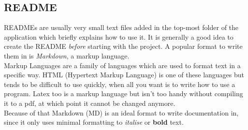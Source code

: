 \documentclass{article}
\begin{document}
	\subsection{README}
	READMEs are usually very small text files added in the top-most folder of the application which briefly explains how to use it. It is generally a good idea to create the README \textit{before} starting with the project. A popular format to write them in is \textit{Markdown}, a markup language. \\
	Markup Languages are a family of languages which are used to format text in a specific way. HTML (Hypertext Markup Language) is one of these languages but tends to be difficult to use quickly, when all you want is to write how to use a program. Latex too is a markup language but isn't too handy without compiling it to a pdf, at which point it cannot be changed anymore. \\
	Because of that Markdown (MD) is an ideal format to write documentation in, since it only uses minimal formatting to \textit{italise} or \textbf{bold} text.\\
\end{document}
